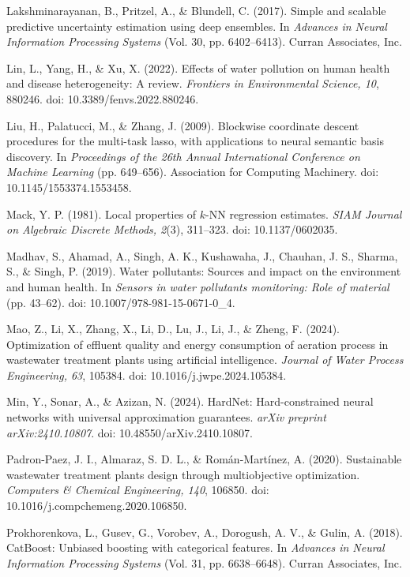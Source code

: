 \documentclass[a4paper,fleqn]{cas-sc}
\begin{document}
\noindent Lakshminarayanan, B., Pritzel, A., \& Blundell, C. (2017). Simple and scalable predictive uncertainty estimation using deep ensembles. In \textit{Advances in Neural Information Processing Systems} (Vol. 30, pp. 6402--6413). Curran Associates, Inc.

\noindent Lin, L., Yang, H., \& Xu, X. (2022). Effects of water pollution on human health and disease heterogeneity: A review. \textit{Frontiers in Environmental Science, 10}, 880246. doi: 10.3389/fenvs.2022.880246.

\noindent Liu, H., Palatucci, M., \& Zhang, J. (2009). Blockwise coordinate descent procedures for the multi-task lasso, with applications to neural semantic basis discovery. In \textit{Proceedings of the 26th Annual International Conference on Machine Learning} (pp. 649--656). Association for Computing Machinery. doi: 10.1145/1553374.1553458.

\noindent Mack, Y. P. (1981). Local properties of $k$-NN regression estimates. \textit{SIAM Journal on Algebraic Discrete Methods, 2}(3), 311--323. doi: 10.1137/0602035.

\noindent Madhav, S., Ahamad, A., Singh, A. K., Kushawaha, J., Chauhan, J. S., Sharma, S., \& Singh, P. (2019). Water pollutants: Sources and impact on the environment and human health. In \textit{Sensors in water pollutants monitoring: Role of material} (pp. 43--62). doi: 10.1007/978-981-15-0671-0\_4.

\noindent Mao, Z., Li, X., Zhang, X., Li, D., Lu, J., Li, J., \& Zheng, F. (2024). Optimization of effluent quality and energy consumption of aeration process in wastewater treatment plants using artificial intelligence. \textit{Journal of Water Process Engineering, 63}, 105384. doi: 10.1016/j.jwpe.2024.105384.

\noindent Min, Y., Sonar, A., \& Azizan, N. (2024). HardNet: Hard-constrained neural networks with universal approximation guarantees. \textit{arXiv preprint arXiv:2410.10807}. doi: 10.48550/arXiv.2410.10807.

\noindent Padron-Paez, J. I., Almaraz, S. D. L., \& Rom\'an-Mart\'inez, A. (2020). Sustainable wastewater treatment plants design through multiobjective optimization. \textit{Computers \& Chemical Engineering, 140}, 106850. doi: 10.1016/j.compchemeng.2020.106850.

\noindent Prokhorenkova, L., Gusev, G., Vorobev, A., Dorogush, A. V., \& Gulin, A. (2018). CatBoost: Unbiased boosting with categorical features. In \textit{Advances in Neural Information Processing Systems} (Vol. 31, pp. 6638--6648). Curran Associates, Inc.
\end{document}
